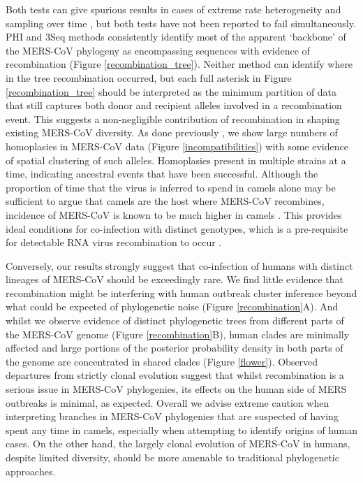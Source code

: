 \documentclass[11pt,oneside,letterpaper]{article}
\def\gdc#1{\textcolor{blue}{[#1]}}
\def\lmc#1{\textcolor{green}{[#1]}}
\begin{document}
Both tests can give spurious results in cases of extreme rate heterogeneity and sampling over time \citep{dudas_mers-cov_2016}, but both tests have not been reported to fail simultaneously.
PHI and 3Seq methods consistently identify most of the apparent `backbone' of the MERS-CoV phylogeny as encompassing sequences with evidence of recombination (Figure \ref{recombination_tree}).
Neither method can identify where in the tree recombination occurred, but each full asterisk in Figure \ref{recombination_tree} should be interpreted as the minimum partition of data that still captures both donor and recipient alleles involved in a recombination event.
This suggests a non-negligible contribution of recombination in shaping existing MERS-CoV diversity.
As done previously \citep{dudas_mers-cov_2016}, we show large numbers of homoplasies in MERS-CoV data (Figure \ref{incompatibilities}) with some evidence of spatial clustering of such alleles.
Homoplasies present in multiple strains at a time, indicating ancestral events that have been successful.
Although the proportion of time that the virus is inferred to spend in camels alone may be sufficient to argue that camels are the host where MERS-CoV recombines, incidence of MERS-CoV is known to be much higher in camels \citep{muller_2014,corman_antibodies_2014,chu_2014,reusken_2014,ali_systematic_2017}.
This provides ideal conditions for co-infection with distinct genotypes, which is a pre-requisite for detectable RNA virus recombination to occur%
.

Conversely, our results strongly suggest that co-infection of humans with distinct lineages of MERS-CoV should be exceedingly rare.
We find little evidence that recombination might be interfering with human outbreak cluster inference beyond what could be expected of phylogenetic noise (Figure \ref{recombination}A).
And whilst we observe evidence of distinct phylogenetic trees from different parts of the MERS-CoV genome (Figure \ref{recombination}B), human clades are minimally affected and large portions of the posterior probability density in both parts of the genome are concentrated in shared clades (Figure \ref{flower}).
Observed departures from strictly clonal evolution suggest that whilst recombination is a serious issue in MERS-CoV phylogenies, its effects on the human side of MERS outbreaks is minimal, as expected.
Overall we advise extreme caution when interpreting branches in MERS-CoV phylogenies that are suspected of having spent any time in camels, especially when attempting to identify origins of human cases.
On the other hand, the largely clonal evolution of MERS-CoV in humans, despite limited diversity, should be more amenable to traditional phylogenetic approaches.
\end{document}
